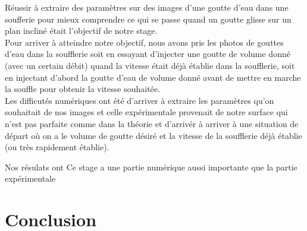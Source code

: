 \documentclass[french]{article}
\begin{document}
Réussir à extraire des paramètres sur des images d'une goutte d'eau dans une soufferie pour mieux comprendre ce qui se passe quand un goutte glisse sur un plan incliné était l'objectif de notre stage.\\


Pour arriver à atteindre notre objectif, nous avons pris les photos de gouttes d'eau dans la soufflerie soit en essayant d'injecter une goutte de volume donné (avec un certain débit) quand la vitesse était déjà établie dans la soufflerie, soit en injectant d'abord la goutte d'eau de volume donné avant de mettre en marche la souffle pour obtenir la vitesse souhaitée.\\

Les difficutés numériques ont été d'arriver à extraire les paramètres qu'on souhaitait de nos images et celle expérimentale provenait de notre surface qui n'est pas parfaite comme dans la théorie et d'arrivér à arriver à une situation de départ où on a le volume de goutte désiré et la vitesse de la soufflerie déjà établie (ou très rapidement établie).

Nos résulats ont
Ce stage a une partie numérique aussi importante que la partie expérimentale
\section{Conclusion}
\end{document}
